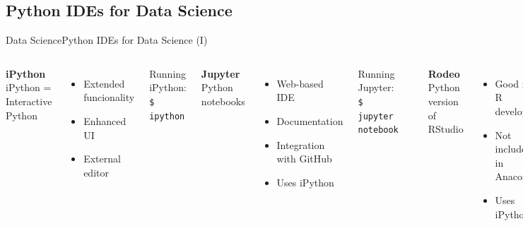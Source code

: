 \documentclass[10pt,compress]{beamer} %
\begin{document}
\subsection{Python IDEs for Data Science}
\begin{frame}{Data Science}{Python IDEs for Data Science (I)}
    \begin{columns}[t]
	   \centering \textbf{iPython}\\
	   iPython = Interactive Python
   		\begin{itemize}
		\item Extended funcionality
		\item Enhanced UI
		\item External editor
		\end{itemize}

		Running iPython:\\
		\texttt{\$ ipython}

	   \centering \textbf{Jupyter}\\
		Python notebooks
	\begin{itemize}
		\item Web-based IDE
		\item Documentation
		\item Integration with GitHub
		\item Uses iPython
	\end{itemize}

		Running Jupyter:\\
		\texttt{\$ jupyter notebook}

		\includegraphics[width=0.8\textwidth]{figs/jupyter.png}	

	   \centering \textbf{Rodeo}\\
		Python version of RStudio
		\begin{itemize}
			\item Good for R developers
			\item Not included in Anaconda
			\item Uses iPython
		\end{itemize}
        

\end{columns}
\end{frame}
\end{document}
